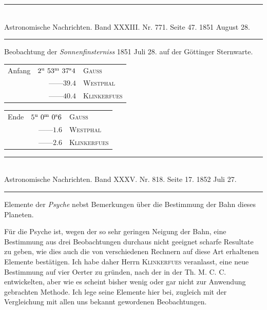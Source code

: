 \clearpage
{}
\begin{center}
\rule{0.55\linewidth}{0.4pt}\\[2pt]
Astronomische Nachrichten. Band XXXIII. Nr. 771. Seite 47. 1851 August 28.\\[2pt]
\rule{0.55\linewidth}{0.4pt}
\end{center}
\begin{center}Beobachtung der \emph{Sonnenfinsterniss} 1851 Juli 28. auf der Göttinger Sternwarte.\end{center}

\begin{center}
\begin{tabular}{lrl}
Anfang & $2^{\rm u}\ 53^{\rm m}\ 37^{\rm s}4$ & \textsc{Gauss} \\
 & \mbox{---\quad---}\quad $39.4$ & \textsc{Westphal} \\
 & \mbox{---\quad---}\quad $40.4$ & \textsc{Klinkerfues} \\
\end{tabular}
\end{center}
\begin{center}
\begin{tabular}{lrl}
Ende & $5^{\rm u}\ 0^{\rm m}\ 0^{\rm s}6$ & \textsc{Gauss} \\
 & \mbox{---\quad---}\quad $1.6$ & \textsc{Westphal} \\
 & \mbox{---\quad---}\quad $2.6$ & \textsc{Klinkerfues} \\
\end{tabular}
\end{center}

\clearpage
\hypertarget{native-484-psyche}{}
\begin{center}
\rule{0.55\linewidth}{0.4pt}\\[2pt]
Astronomische Nachrichten. Band XXXV. Nr. 818. Seite 17. 1852 Juli 27.\\[2pt]
\rule{0.55\linewidth}{0.4pt}
\end{center}
\begin{center}Elemente der \emph{Psyche} nebst Bemerkungen über die Bestimmung der Bahn dieses Planeten.\end{center}

Für die Psyche ist, wegen der so sehr geringen Neigung der Bahn, eine Bestimmung aus drei Beobachtungen durchaus nicht geeignet scharfe Resultate zu geben, wie dies auch die von verschiedenen Rechnern auf diese Art erhaltenen Elemente bestätigen. Ich habe daher Herrn \textsc{Klinkerfues} veranlasst, eine neue Bestimmung auf vier Oerter zu gründen, nach der in der Th. M. C. C. entwickelten, aber wie es scheint bisher wenig oder gar nicht zur Anwendung gebrachten Methode. Ich lege seine Elemente hier bei, zugleich mit der Vergleichung mit allen uns bekannt gewordenen Beobachtungen.

